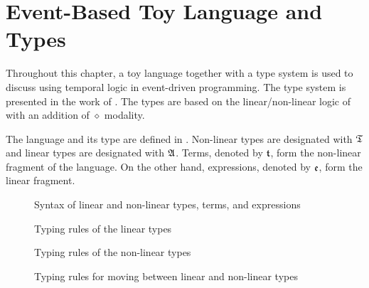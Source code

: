 \section{Event-Based Toy Language and Types}

Throughout this chapter, a toy language together with a type system is used to discuss using temporal logic in event-driven programming. The type system is presented in the work of \cite{Paykin2016TheEO}. The types are based on the linear/non-linear logic of \cite{DBLP:conf/csl/Benton94} with an addition of $\diamond$ modality.

The language and its type are defined in . Non-linear types are designated with $\mathfrak{T}$ and linear types are designated with $\mathfrak{A}$. Terms, denoted by $\mathfrak{t}$, form the non-linear fragment of the language. On the other hand, expressions, denoted by $\mathfrak{e}$, form the linear fragment.

\begin{figure}
    \centering
    
    \caption{Syntax of linear and non-linear types, terms, and expressions}
    \label{fig:syntax-of-types-terms-expressions}
\end{figure}

\begin{figure}
    \centering
    
    \caption{Typing rules of the linear types}
    \label{fig:typing-rules-for-nonlinear-types}
\end{figure}

\begin{figure}
    \centering
    
    \caption{Typing rules of the non-linear types}
    \label{fig:typing-rules-for-linear-types}
\end{figure}

\begin{figure}
    \centering
    
    \caption{Typing rules for moving between linear and non-linear types}
    \label{fig:typing-rules-for-linear-and-nonlinear-types}
\end{figure}

